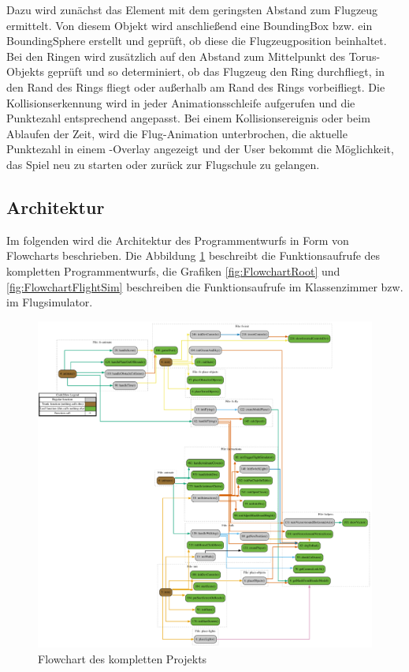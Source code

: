 Dazu wird zunächst das Element mit dem geringsten Abstand zum Flugzeug ermittelt.
Von diesem Objekt wird anschließend eine BoundingBox bzw. ein BoundingSphere erstellt und geprüft, ob diese die Flugzeugposition beinhaltet.
Bei den Ringen wird zusätzlich auf den Abstand zum Mittelpunkt des Torus-Objekts geprüft und so determiniert, ob das Flugzeug den Ring durchfliegt, in den Rand des Rings fliegt oder außerhalb am Rand des Rings vorbeifliegt.
Die Kollisionserkennung wird in jeder Animationsschleife aufgerufen und die Punktezahl entsprechend angepasst.
Bei einem Kollisionsereignis oder beim Ablaufen der Zeit, wird die Flug-Animation unterbrochen, die aktuelle Punktezahl in einem -Overlay angezeigt und der User bekommt die Möglichkeit, das Spiel neu zu starten oder zurück zur Flugschule zu gelangen.

\subsection{Architektur}
Im folgenden wird die Architektur des Programmentwurfs in Form von Flowcharts beschrieben.
Die Abbildung \ref{fig:FlowchartComplete} beschreibt die Funktionsaufrufe des kompletten Programmentwurfs, die Grafiken
\ref{fig:FlowchartRoot} und \ref{fig:FlowchartFlightSim} beschreiben die Funktionsaufrufe im Klassenzimmer bzw. im Flugsimulator.
\begin{figure}[H]
  \centering
  \includegraphics[width=1\textwidth]{images/flowchart/complete.pdf}
  \caption{Flowchart des kompletten Projekts}
  \label{fig:FlowchartComplete}
\end{figure}\noindent
